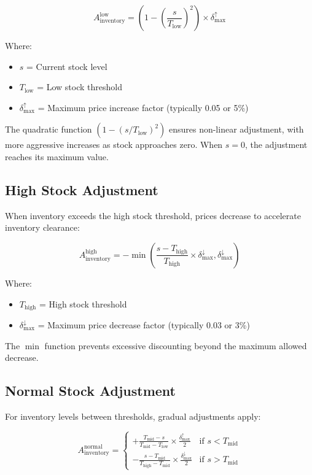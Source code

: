 \documentclass[12pt,a4paper,oneside]{report}
\begin{document}
\begin{equation}
A_{\text{inventory}}^{\text{low}} = \left(1 - \left(\frac{s}{T_{\text{low}}}\right)^2\right) \times \delta_{\text{max}}^{\uparrow}
\end{equation}

Where:
\begin{itemize}
    \item $s$ = Current stock level
    \item $T_{\text{low}}$ = Low stock threshold
    \item $\delta_{\text{max}}^{\uparrow}$ = Maximum price increase factor (typically 0.05 or 5\%)
\end{itemize}

The quadratic function $(1 - (s/T_{\text{low}})^2)$ ensures non-linear adjustment, with more aggressive increases as stock approaches zero. When $s = 0$, the adjustment reaches its maximum value.

\subsection{High Stock Adjustment}

When inventory exceeds the high stock threshold, prices decrease to accelerate inventory clearance:

\begin{equation}
A_{\text{inventory}}^{\text{high}} = -\min\left(\frac{s - T_{\text{high}}}{T_{\text{high}}} \times \delta_{\text{max}}^{\downarrow}, \delta_{\text{max}}^{\downarrow}\right)
\end{equation}

Where:
\begin{itemize}
    \item $T_{\text{high}}$ = High stock threshold
    \item $\delta_{\text{max}}^{\downarrow}$ = Maximum price decrease factor (typically 0.03 or 3\%)
\end{itemize}

The $\min$ function prevents excessive discounting beyond the maximum allowed decrease.

\subsection{Normal Stock Adjustment}

For inventory levels between thresholds, gradual adjustments apply:

\begin{equation}
A_{\text{inventory}}^{\text{normal}} = \begin{cases}
+\frac{T_{\text{mid}} - s}{T_{\text{mid}} - T_{\text{low}}} \times \frac{\delta_{\text{max}}^{\uparrow}}{2} & \text{if } s < T_{\text{mid}} \\
-\frac{s - T_{\text{mid}}}{T_{\text{high}} - T_{\text{mid}}} \times \frac{\delta_{\text{max}}^{\downarrow}}{2} & \text{if } s > T_{\text{mid}}
\end{cases}
\end{equation}
\end{document}
